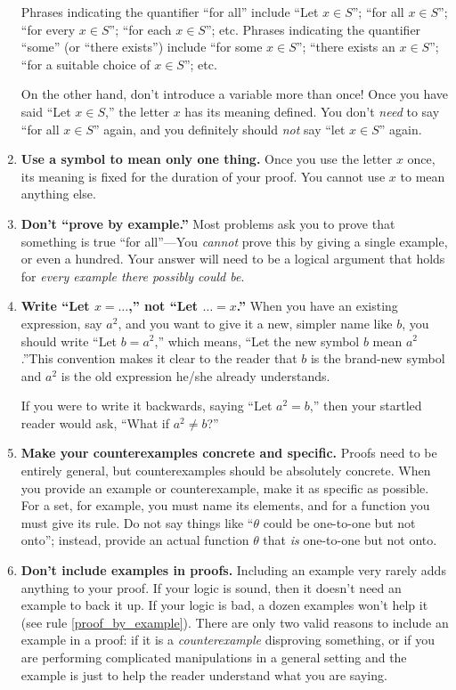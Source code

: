 \begin{enumerate}
Phrases indicating the quantifier ``for all'' include ``Let \(x\in S\)''; ``for all \(x\in S\)''; ``for every \(x\in S\)''; ``for each \(x\in S\)''; etc. Phrases indicating the quantifier ``some'' (or ``there exists'') include ``for some \(x\in S\)''; ``there exists an \(x\in S\)''; ``for a suitable choice of \(x\in S\)''; etc.

On the other hand, don't introduce a variable more than once! Once you have said ``Let \(x\in S\),'' the letter \(x\) has its meaning defined. You don't \emph{need} to say ``for all \(x\in S\)'' again, and you definitely should \emph{not} say ``let \(x\in S\)'' again.

\item \textbf{Use a symbol to mean only one thing.} Once you use the letter \(x\) once, its meaning is fixed for the duration of your proof. You cannot use \(x\) to mean anything else.

\item \textbf{Don't ``prove by example.''}\label{proof_by_example} Most problems ask you to prove that something is true ``for all''---You \emph{cannot} prove this by giving a single example, or even a hundred. Your answer will need to be a logical argument that holds for \emph{every example there possibly could be}.

\item \textbf{Write ``Let \(x=\dots\),'' not ``Let \(\dots=x\).''} When you have an existing expression, say \(a^{2}\), and you want to give it a new, simpler name like \(b\), you should write ``Let \(b=a^{2}\),'' which means, ``Let the new symbol \(b\) mean \(a^{2}\).''This convention makes it clear to the reader that \(b\) is the brand-new symbol and \(a^{2}\) is the old expression he/she already understands.

If you were to write it backwards, saying ``Let \(a^{2}=b\),'' then your startled reader would ask, ``What if \(a^{2}\neq b\)?''
  
\item \textbf{Make your counterexamples concrete and specific.} Proofs need to be entirely general, but counterexamples should be absolutely concrete. When you provide an example or counterexample, make it as specific as possible. For a set, for example, you must name its elements, and for a function you must give its rule. Do not say things like ``\(\theta\) could be one-to-one but not onto'';
instead, provide an actual function \(\theta\) that \emph{is} one-to-one but not onto.
    
\item \textbf{Don't include examples in proofs.} Including an example very rarely adds anything to your proof. If your logic is sound, then it doesn't need an example to back it up. If your logic is bad, a dozen examples won't help it (see rule \ref{proof_by_example}). There are only two valid reasons to include an example in a proof: if it is a \emph{counterexample} disproving something, or if you are performing complicated manipulations in a general setting and the example is just to help the reader understand what you are saying.


\end{enumerate}
